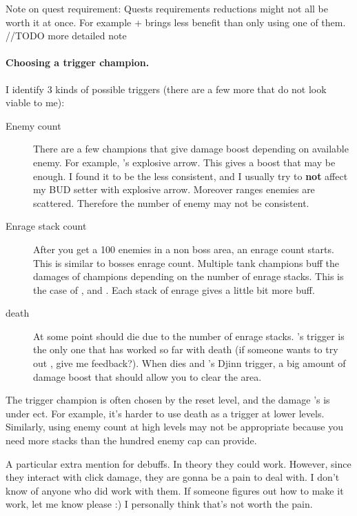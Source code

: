 \documentclass{article}
\begin{document}
Note on quest requirement: Quests requirements reductions might not all be worth it at once.
For example \vjara + \nahara brings less benefit than only using one of them.
//TODO more detailed note

\paragraph{Choosing a trigger champion.}

I identify 3 kinds of possible triggers (there are a few more that do not look viable to me):
\begin{description}
    \item[Enemy count] There are a few champions that give damage boost depending on available enemy.
    For example, \shandie's explosive arrow.
    This gives a boost that may be enough.
    I found it to be the less consistent, and I usually try to \textbf{not} affect my BUD setter with explosive arrow.
    Moreover ranges enemies are scattered.
    Therefore the number of enemy may not be consistent.
    
    \item[Enrage stack count]
    After you get a 100 enemies in a non boss area, an enrage count starts.
    This is similar to bosses enrage count.
    Multiple tank champions buff the damages of champions depending on the number of enrage stacks.
    This is the case of \dragonbait, \tyril and \nayeli.
    Each stack of enrage gives a little bit more buff.
    
    \item[\briv death] At some point \briv should die due to the number of enrage stacks.
    \baeloth's trigger is the only one that has worked so far with \briv death (if someone wants to try out \desmond, give me feedback?).
    When \briv dies and \baeloth's Djinn trigger, a big amount of damage boost that should allow you to clear the area.
\end{description}

The trigger champion is often chosen by the reset level, and the damage \briv's is under ect.
For example, it's harder to use \briv death as a trigger at lower levels.
Similarly, using enemy count at high levels may not be appropriate because you need more stacks than the hundred enemy cap can provide.

A particular extra mention for debuffs.
In theory they could work.
However, since they interact with click damage, they are gonna be a pain to deal with.
I don't know of anyone who did work with them.
If someone figures out how to make it work, let me know please :)
I personally think that's not worth the pain.
\end{document}
